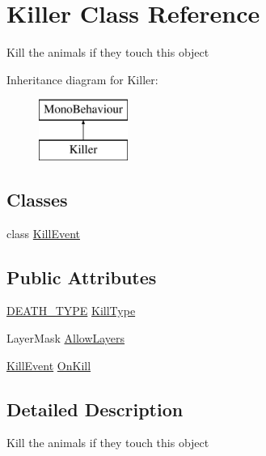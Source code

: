 \hypertarget{class_killer}{}\section{Killer Class Reference}
\label{class_killer}


Kill the animals if they touch this object  


Inheritance diagram for Killer\+:\begin{figure}[H]
\begin{center}
\leavevmode
\includegraphics[height=2.000000cm]{class_killer}
\end{center}
\end{figure}
\subsection*{Classes}
\begin{DoxyCompactItemize}
\item 
class \mbox{\hyperlink{class_killer_1_1_kill_event}{Kill\+Event}}
\end{DoxyCompactItemize}
\subsection*{Public Attributes}
\begin{DoxyCompactItemize}
\item 
\mbox{\hyperlink{_animal_8cs_aa09ea87b75a706096f010aef7b9b1826}{D\+E\+A\+T\+H\+\_\+\+T\+Y\+PE}} \mbox{\hyperlink{class_killer_ad7cce6f398d043f17c809ad41fe9f18d}{Kill\+Type}}
\item 
Layer\+Mask \mbox{\hyperlink{class_killer_a903205bb086ca8df71c9a7c2069a6429}{Allow\+Layers}}
\item 
\mbox{\hyperlink{class_killer_1_1_kill_event}{Kill\+Event}} \mbox{\hyperlink{class_killer_ac72e298451c58bc747a4b98edc2a9cb0}{On\+Kill}}
\end{DoxyCompactItemize}


\subsection{Detailed Description}
Kill the animals if they touch this object 



